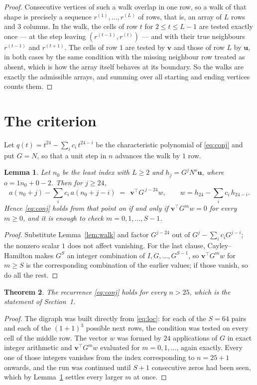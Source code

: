 \documentclass[11pt,a4paper]{article}
\theoremstyle{plain}
\newtheorem{theorem}{Theorem}
\newtheorem{lemma}[theorem]{Lemma}
\theoremstyle{definition}
\begin{document}
\begin{proof}
Consecutive vertices of such a walk overlap in one row, so a walk of that shape is
precisely a sequence $r^{(1)},\dots,r^{(L)}$ of rows, that is, an array of $L$ rows
and $3$ columns. In the walk, the cells of row $t$ for $2\le t\le L-1$ are tested
exactly once --- at the step leaving $(r^{(t-1)},r^{(t)})$ --- and with their true
neighbours $r^{(t-1)}$ and $r^{(t+1)}$. The cells of row $1$ are tested by
$\mathbf{v}$ and those of row $L$ by $\mathbf{u}$, in both cases by the same condition
with the missing neighbour row treated as absent, which is how the array itself behaves at
its boundary. So the walks are exactly the admissible arrays, and summing over all starting
and ending vertices counts them.
\end{proof}

\section{The criterion}

Let $q(t)=t^{24}-\sum_i c_i\,t^{24-i}$ be the characteristic polynomial of
\eqref{eq:conj} and put $G=N$, so that a unit step in $n$ advances the walk by
$1$ row.

\begin{lemma}\label{lem:crit}
Let $n_0$ be the least index with $L\ge2$ and $h_j=G^{j}N^{o}\mathbf{u}$, where
$o=1n_0+0-2$. Then for $j\ge24$,
\[
a(n_0+j)-\sum_i c_i\,a(n_0+j-i)\;=\;\,\mathbf{v}^{\!\top}G^{\,j-24}w,
\qquad w=h_{24}-\sum_i c_i\,h_{24-i} .
\]
Hence \eqref{eq:conj} holds from that point on if and only if
$\mathbf{v}^{\!\top}G^{m}w=0$ for every $m\ge0$, and it is enough to check
$m=0,1,\dots,S-1$.
\end{lemma}

\begin{proof}
Substitute Lemma~\ref{lem:walk} and factor $G^{j-24}$ out of
$G^{j}-\sum_ic_iG^{j-i}$; the nonzero scalar $1$ does not affect
vanishing. For the last clause, Cayley--Hamilton makes $G^{S}$ an integer combination of
$I,G,\dots,G^{S-1}$, so $\mathbf{v}^{\!\top}G^{m}w$ for $m\ge S$ is the corresponding
combination of the earlier values; if those vanish, so do all the rest.
\end{proof}

\begin{theorem}
The recurrence \eqref{eq:conj} holds for every $n>25$, which is the statement of
Section~1.
\end{theorem}

\begin{proof}
The digraph was built directly from \eqref{eq:loc}: for each of the $S=64$ pairs and each
of the $(1+1)^{3}$ possible next rows, the condition was tested on every cell of
the middle row. The vector $w$ was formed by $24$ applications of $G$ in exact integer
arithmetic and $\mathbf{v}^{\!\top}G^{m}w$ evaluated for $m=0,1,\dots$, again exactly.
Every one of those integers vanishes from the index corresponding to $n=25+1$ onwards,
and the run was continued until $S+1$ consecutive zeros had been seen, which by
Lemma~\ref{lem:crit} settles every larger $m$ at once.
\end{proof}
\end{document}
